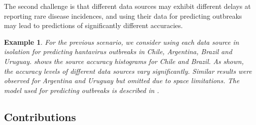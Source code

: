 \documentclass[twoside,leqno,twocolumn]{article}
\newtheorem{example}{Example}
\begin{document}
The second challenge is that different data sources may exhibit different delays at reporting rare disease incidences, and using their data for predicting outbreaks may lead to predictions of significantly different accuracies. 

\begin{example}
For the previous scenario, we consider using each data source in isolation for predicting hantavirus outbreaks in Chile, Argentina, Brazil and Uruguay.  shows the source accuracy histograms for Chile and Brazil. As shown, the accuracy levels of different data sources vary significantly. Similar results were observed for Argentina and Uruguay but omitted due to space limitations. The model used for predicting outbreaks is described in .
\end{example}

\subsection{Contributions}
\label{sec:contr}
\end{document}
